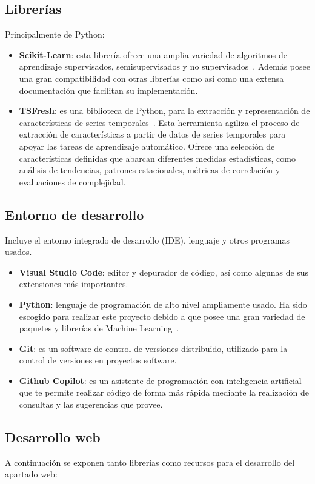 \subsection{Librerías}
Principalmente de Python:
\begin{itemize}
\item \textbf{Scikit-Learn}: esta librería ofrece una amplia variedad de algoritmos de aprendizaje supervisados, semisupervisados y no supervisados~\cite{sklearnHome}. Además posee una gran compatibilidad con otras librerías como así como una extensa documentación que facilitan su implementación.
\item \textbf{TSFresh}: es una biblioteca de Python, para la extracción y representación de características de series temporales~\cite{tsfreshHome}. Esta herramienta agiliza el proceso de extracción de características a partir de datos de series temporales para apoyar las tareas de aprendizaje automático. Ofrece una selección de características definidas que abarcan diferentes medidas estadísticas, como análisis de tendencias, patrones estacionales, métricas de correlación y evaluaciones de complejidad.
\end{itemize}

\subsection{Entorno de desarrollo}
Incluye el entorno integrado de desarrollo (IDE), lenguaje y otros programas usados.
\begin{itemize}
\item \textbf{Visual Studio Code}: editor y depurador de código, así como algunas de sus extensiones más importantes.
\item \textbf{Python}: lenguaje de programación de alto nivel ampliamente usado. Ha sido escogido para realizar este proyecto debido a que posee una gran variedad de paquetes y librerías de Machine Learning~\cite{python}.
\item \textbf{Git}: es un software de control de versiones distribuido, utilizado para la control de versiones en proyectos software.
\item \textbf{Github Copilot}: es un asistente de programación con inteligencia artificial que te permite realizar código de forma más rápida mediante la realización de consultas y las sugerencias que provee.
\end{itemize}
\subsection{Desarrollo web}
A continuación se exponen tanto librerías como recursos para el desarrollo del apartado web:

